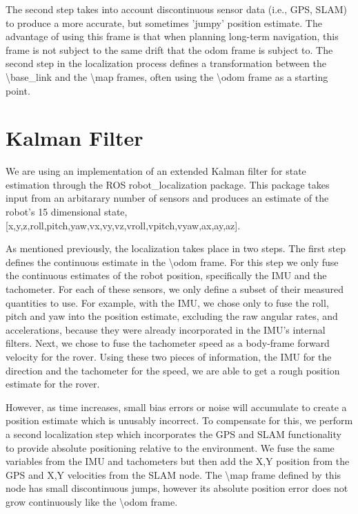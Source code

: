 The second step takes into account discontinuous sensor data (i.e., GPS, SLAM) to produce a more accurate, but sometimes 'jumpy' position estimate. The advantage of using this frame is that when planning long-term navigation, this frame is not subject to the same drift that the odom frame is subject to. The second step in the localization process defines a transformation between the \textbackslash base\_link and the \textbackslash map frames, often using the \textbackslash odom frame as a starting point.

\section{Kalman Filter}

We are using an implementation of an extended Kalman filter for state estimation through the ROS robot\_localization package. This package takes input from an arbitarary number of sensors and produces an estimate of the robot's 15 dimensional state, [x,y,z,roll,pitch,yaw,vx,vy,vz,vroll,vpitch,vyaw,ax,ay,az]\cite{Moore2016}. 

As mentioned previously, the localization takes place in two steps. The first step defines the continuous estimate in the \textbackslash odom frame. For this step we only fuse the continuous estimates of the robot position, specifically the IMU and the tachometer. For each of these sensors, we only define a subset of their measured quantities to use. For example, with the IMU, we chose only to fuse the roll, pitch and yaw into the position estimate, excluding the raw angular rates, and accelerations, because they were already incorporated in the IMU's internal filters. Next, we chose to fuse the tachometer speed as a body-frame forward velocity for the rover. Using these two pieces of information, the IMU for the direction and the tachometer for the speed, we are able to get a rough position estimate for the rover. 

However, as time increases, small bias errors or noise will accumulate to create a position estimate which is unusably incorrect. To compensate for this, we perform a second localization step which incorporates the GPS and SLAM functionality to provide absolute positioning relative to the environment. We fuse the same variables from the IMU and tachometers but then add the X,Y position from the GPS and X,Y velocities from the SLAM node. The \textbackslash map frame defined by this node has small discontinuous jumps, however its absolute position error does not grow continuously like the \textbackslash odom frame.

